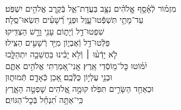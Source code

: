 \documentclass[twoside, openany, parskip=half, 11pt]{book}
\begin{document}
\\
\vspace{-1.5\baselineskip}
\begin{narrow}
%
מִזְמ֗וֹר לְֿאָ֫סָ֥ף \hfill \break
אֱֽלֹהִ֗ים נִצָּ֥ב בַּעֲדַת־אֵ֑ל \hfill בְּֿקֶ֖רֶב אֱלֹהִ֣ים יִשְׁפֹּֽט׃ \\
עַד־מָתַ֥י תִּשְׁפְּֿֿטוּ־עָ֑וֶל \hfill וּפְנֵ֥י רְֿ֝שָׁעִ֗ים תִּשְׂאוּ־סֶֽלָה׃ \\
שִׁפְטוּ־דַ֥ל וְֿיָת֑וֹם \hfill עָנִ֖י וָרָ֣שׁ הַצְדִּֽיקוּ׃ \\
פַּלְּֿטוּ־דַ֥ל וְֿאֶבְי֑וֹן \hfill מִיַּ֖ד רְֿשָׁעִ֣ים הַצִּֽילוּ׃ \\
לֹ֤א יָדְֿע֨וּ ׀ וְֿלֹ֥א יָבִ֗ינוּ \hfill בַּחֲשֵׁכָ֥ה יִתְהַלָּ֑כוּ \\ יִ֝מּ֗וֹטוּ כׇּל־מ֥וֹסְֿדֵי אָֽרֶץ׃ \hfill
אֲֽנִי־אָ֭מַרְתִּי אֱלֹהִ֣ים אַתֶּ֑ם \\ וּבְנֵ֖י עֶלְי֣וֹן כֻּלְּֿכֶֽם׃ \hfill
אָ֭כֵן כְּֿאָדָ֣ם תְּֿמוּת֑וּן \\ וּכְאַחַ֖ד הַשָּׂרִ֣ים תִּפֹּֽלוּ׃ \hfill
קוּמָ֣ה אֱ֭לֹהִים שׇׁפְטָ֣ה הָאָ֑רֶץ \\ כִּֽי־אַתָּ֥ה תִ֝נְחַ֗ל בְּֿכׇל־הַגּוֹיִֽם׃ \hfill \break
\end{narrow}
\end{document}
